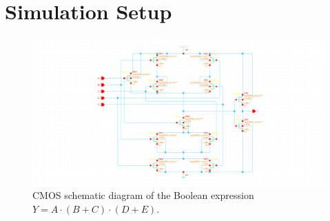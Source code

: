 \documentclass[11pt]{article}
\begin{document}
\section{Simulation Setup}
\begin{figure}[!h]
    \centering
    \includegraphics[width=\textwidth]{schematic.png}
    \caption{CMOS schematic diagram of the Boolean expression $Y=A\cdot(B+C)\cdot(D+E)$.}
\end{figure}
\end{document}
